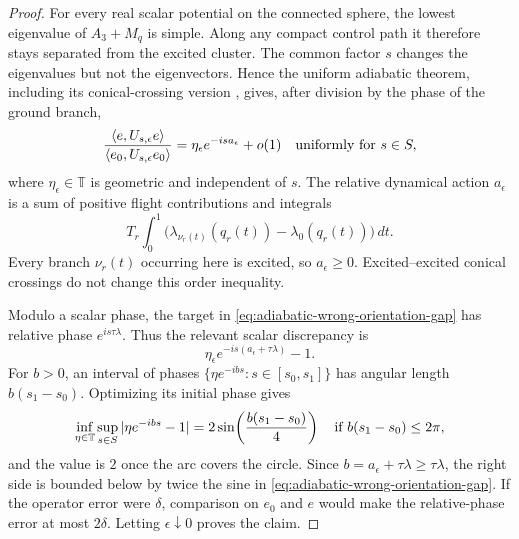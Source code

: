 \documentclass[11pt]{article}
\theoremstyle{remark}
\begin{document}
\begin{proof}
For every real scalar potential on the connected sphere, the lowest
eigenvalue of $A_3+M_q$ is simple.  Along any compact control path it therefore
stays separated from the excited cluster.  The common factor $s$ changes the
eigenvalues but not the eigenvectors.  Hence the uniform adiabatic theorem,
including its conical-crossing version
\cite{AugierBoscainSigalotti2018}, gives, after division by the phase of the
ground branch,
\begin{equation}
 \frac{\langle e,U_{s,\epsilon}e\rangle}
      {\langle e_0,U_{s,\epsilon}e_0\rangle}
 =
 \eta_\epsilon e^{-isa_\epsilon}+o(1)
 \quad\hbox{uniformly for }s\in S,
 \label{eq:adiabatic-relative-forward-action}
\end{equation}
where $\eta_\epsilon\in\mathbb T$ is geometric and independent of $s$.  The
relative dynamical action $a_\epsilon$ is a sum of positive flight
contributions and integrals
\[
 T_r\int_0^1
 \bigl(\lambda_{\nu_r(t)}(q_r(t))-\lambda_0(q_r(t))\bigr)\,dt .
\]
Every branch $\nu_r(t)$ occurring here is excited, so
$a_\epsilon\geq0$.  Excited--excited conical crossings do not change this
order inequality.

Modulo a scalar phase, the target in
\eqref{eq:adiabatic-wrong-orientation-gap} has relative phase
$e^{is\tau\lambda}$.  Thus the relevant scalar discrepancy is
\[
 \eta_\epsilon e^{-is(a_\epsilon+\tau\lambda)}-1.
\]
For $b>0$, an interval of phases
$\{\eta e^{-ibs}:s\in[s_0,s_1]\}$ has angular length
$b(s_1-s_0)$.  Optimizing its initial phase gives
\[
 \inf_{\eta\in\mathbb T}\sup_{s\in S}|\eta e^{-ibs}-1|
 =
 2\sin\!\left(\frac{b(s_1-s_0)}4\right)
 \quad\hbox{if }b(s_1-s_0)\leq2\pi,
\]
and the value is $2$ once the arc covers the circle.  Since
$b=a_\epsilon+\tau\lambda\geq\tau\lambda$, the right side is bounded below
by twice the sine in \eqref{eq:adiabatic-wrong-orientation-gap}.  If the
operator error were $\delta$, comparison on $e_0$ and $e$ would make the
relative-phase error at most $2\delta$.  Letting $\epsilon\downarrow0$ proves
the claim.
\end{proof}
\end{document}
